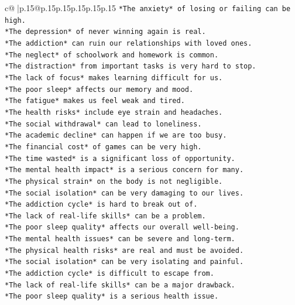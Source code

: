 \documentclass{article}
\begin{document}
{\begin{supertabular}{c@{$\;$}|p{.15\linewidth}@{}p{.15\linewidth}p{.15\linewidth}p{.15\linewidth}p{.15\linewidth}p{.15\linewidth}}
{{{\texttt{*The anxiety* of losing or failing can be high.} \\
\texttt{*The depression* of never winning again is real.} \\
\texttt{*The addiction* can ruin our relationships with loved ones.} \\
\texttt{*The neglect* of schoolwork and homework is common.} \\
\texttt{*The distraction* from important tasks is very hard to stop.} \\
\texttt{*The lack of focus* makes learning difficult for us.} \\
\texttt{*The poor sleep* affects our memory and mood.} \\
\texttt{*The fatigue* makes us feel weak and tired.} \\
\texttt{*The health risks* include eye strain and headaches.} \\
\texttt{*The social withdrawal* can lead to loneliness.} \\
\texttt{*The academic decline* can happen if we are too busy.} \\
\texttt{*The financial cost* of games can be very high.} \\
\texttt{*The time wasted* is a significant loss of opportunity.} \\
\texttt{*The mental health impact* is a serious concern for many.} \\
\texttt{*The physical strain* on the body is not negligible.} \\
\texttt{*The social isolation* can be very damaging to our lives.} \\
\texttt{*The addiction cycle* is hard to break out of.} \\
\texttt{*The lack of real{-}life skills* can be a problem.} \\
\texttt{*The poor sleep quality* affects our overall well{-}being.} \\
\texttt{*The mental health issues* can be severe and long{-}term.} \\
\texttt{*The physical health risks* are real and must be avoided.} \\
\texttt{*The social isolation* can be very isolating and painful.} \\
\texttt{*The addiction cycle* is difficult to escape from.} \\
\texttt{*The lack of real{-}life skills* can be a major drawback.} \\
\texttt{*The poor sleep quality* is a serious health issue.} \\
}}}
\end{supertabular}}
\end{document}
